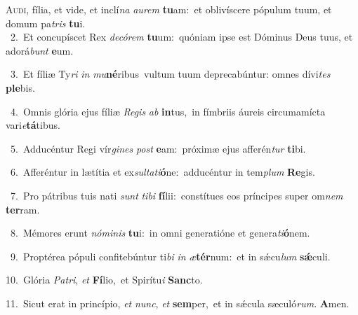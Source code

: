 \lettrine{\initial\textcolor{\initialcolor}{A}}{udi,} fília, et vide, et inclí\textit{na} \textit{au}\-\textit{rem} \textbf{tu}\-am:~\star et oblivíscere pópulum tuum, et domum pa\textit{tris} \textbf{tu}\-i.\\
{\numbfont\textcolor{\numbcolor}{~2.}}~Et concupíscet Rex \textit{de}\-\textit{có}\textit{rem} \textbf{tu}\-um:~\star quóniam ipse est Dóminus Deus tuus, et adorá\textit{bunt} \textbf{e}\-um.\par
{\numbfont\textcolor{\numbcolor}{~3.}}~Et fíliæ Ty\textit{ri} \textit{in} \textit{mu}\-\textbf{né}ribus~\star vultum tuum deprecabúntur: omnes dívi\textit{tes} \textbf{ple}\-bis.\par
{\numbfont\textcolor{\numbcolor}{~4.}}~Omnis glória ejus fíliæ \textit{Re}\-\textit{gis} \textit{ab} \textbf{in}\-tus,~\star in fímbriis áureis circumamícta vari\-\textit{e}\-\textbf{tá}tibus.\par
{\numbfont\textcolor{\numbcolor}{~5.}}~Adducéntur Regi vír\-\textit{gi}\-\textit{nes} \textit{post} \textbf{e}\-am:~\star próximæ ejus afferén\textit{tur} \textbf{ti}\-bi.\par
{\numbfont\textcolor{\numbcolor}{~6.}}~Afferéntur in lætítia et ex\-\textit{sul}\-\textit{ta}\textit{ti}\textbf{ó}ne:~\star adducéntur in tem\textit{plum} \textbf{Re}\-gis.\par
{\numbfont\textcolor{\numbcolor}{~7.}}~Pro pátribus tuis nati \textit{sunt} \textit{ti}\-\textit{bi} \textbf{fí}\-lii:~\star constítues eos príncipes super om\textit{nem} \textbf{ter}\-ram.\par
{\numbfont\textcolor{\numbcolor}{~8.}}~Mémores erunt \textit{nó}\-\textit{mi}\textit{nis} \textbf{tu}\-i:~\star in omni generatióne et genera\-\textit{ti}\-\textbf{ó}nem.\par
{\numbfont\textcolor{\numbcolor}{~9.}}~Proptérea pópuli confitebúntur ti\textit{bi} \textit{in} \textit{æ}\-\textbf{tér}num:~\star et in sǽcu\textit{lum} \textbf{sǽ}\-culi.\par
{\numbfont\textcolor{\numbcolor}{10.}}~Glória \textit{Pa}\-\textit{tri}, \textit{et} \textbf{Fí}\-lio,~\star et Spirítu\textit{i} \textbf{Sanc}\-to.\par
{\numbfont\textcolor{\numbcolor}{11.}}~Sicut erat in princípio, \textit{et} \textit{nunc}\-, \textit{et} \textbf{sem}\-per,~\star et in sǽcula sæculó\-\textit{rum}\-. \textbf{A}\-men.\par
